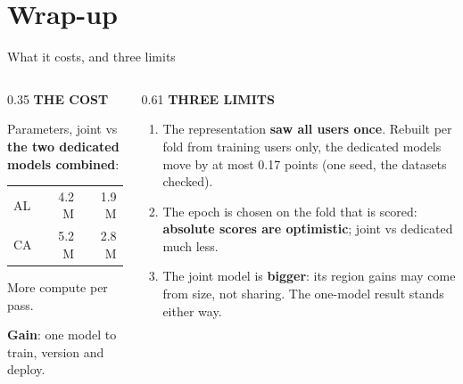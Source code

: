 \documentclass{beamer}
\begin{document}
\section{Wrap-up}

\begin{frame}{What it costs, and three limits}
    \vspace{0pt}%
    \footnotesize
    \begin{columns}[T,onlytextwidth]
        \begin{column}{0.35\textwidth}
            \textbf{\color{primaryshade}THE COST}\par\medskip
            Parameters, joint vs \textbf{the two dedicated models combined}:\par\medskip
            \begin{tabular}{@{}l@{\ \ }r@{\ vs\ }r@{}}
                AL & 4.2 M & 1.9 M \\
                CA & 5.2 M & 2.8 M
            \end{tabular}\par\medskip
            More compute per pass.\par\medskip
            \alert{\textbf{Gain}}: one model to train, version and deploy.
        \end{column}
        \hfill
        \begin{column}{0.61\textwidth}
            \textbf{\color{alertshade}THREE LIMITS}\par\medskip
            \begin{enumerate}\setlength{\itemsep}{1.1ex}
                \item The representation \textbf{saw all users once}. Rebuilt per fold from
                      training users only, the dedicated models move by at most 0.17 points (one
                      seed, the datasets checked).
                \item The epoch is chosen on the fold that is scored: \textbf{absolute scores are
                      optimistic}; joint vs dedicated much less.
                \item The joint model is \textbf{bigger}: its region gains \alert{may come from
                      size, not sharing}. The one-model result stands either way.
            \end{enumerate}
        \end{column}
    \end{columns}
\end{frame}
\end{document}
